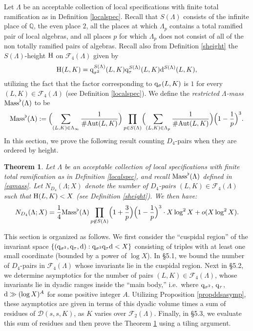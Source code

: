 \documentclass[10pt]{article}
\theoremstyle{plain}
\newtheorem{thm}{Theorem}[section]
\theoremstyle{definition}
\theoremstyle{remark}
\DeclareMathOperator{\Aut}{Aut}
\def\Aut{{\rm Aut}}
\def\Mass{{\rm Mass}}
\def\FF{{\mathcal F}}
\def\Q{{\mathbb Q}}
\def\H{{\rm H}}
\def\Q{{\mathbb Q}}
\def\cD{{\mathcal D}}
\newcommand{\D}{{\rm d}}
\newcommand{\q}{{\rm q}}
\begin{document}
Let $\Lambda$ be an acceptable collection of local
specifications with finite total ramification as in Definition \ref{localspec}. Recall that $S(\Lambda)$ consists of the infinite place of $\Q$, the even place $2$, all the places at which $\Lambda_p$ contains a  total ramified pair of local algebras, and all places $p$ for which $\Lambda_p$ does not consist of all of the non totally ramified pairs of algebras. Recall also from Definition \ref{sheight} the $S(\Lambda)$-height $\H$ on $\FF_4(\Lambda)$ given by
\begin{equation*}
\H(L,K)=\q^{S(\Lambda)}_{\sigma^2}(L,K)\q^{S(\Lambda)}_{\tau}(L,K)\D^{S(\Lambda)}(L,K),
\end{equation*}
utilizing the fact that the factor corresponding to $\q_\sigma(L,K)$ is $1$ for every $(L,K) \in \FF_4(\Lambda)$ (see Definition \ref{localspec}). We define the
{\it restricted $\Lambda$-mass} $\Mass^\flat(\Lambda)$ to be
\begin{equation}\label{eqmass}
\Mass^\flat(\Lambda):=\Bigl(\sum_{(L,K)\in\Lambda_\infty}\frac{1}{\#\Aut(L,K)}\Bigr)
\prod_{p\in S(\Lambda)} \Bigl(\sum_{(L,K)\in\Lambda_p}
\frac{1}{\#\Aut(L,K)}\Bigr)\Bigl( 1-\frac{1}{p}\Bigr)^3.
\end{equation}
In this section, we prove the following result counting $D_4$-pairs
when they are ordered by height. 
\begin{thm}\label{thD4quar}
Let $\Lambda$ be an acceptable collection of local
specifications with finite total ramification as in Definition \ref{localspec},   and recall $\Mass^\flat(\Lambda)$ defined in \eqref{eqmass}. Let $N_{D_4}(\Lambda;X)$
denote the number of $D_4$-pairs $(L,K)\in\FF_4(\Lambda)$ such that
$\H(L,K)<X$ (see Definition \ref{sheight}). We then have:
\begin{equation*}
N_{D_4}(\Lambda;X)=\frac{1}{4}\Mass^\flat(\Lambda)\prod_{p\not\in S(\Lambda)}
\Bigl(1+\frac{3}{p}\Bigr)\Bigl(1-\frac{1}{p}\Bigr)^3\cdot X\log^2 X
+o(X\log^2 X).
\end{equation*}
\end{thm}

This section is organized as follows. We first consider the ``cuspidal
region'' of the invariant space
$\{(\q_{\sigma^2},\q_{\tau},\D):\q_{\sigma^2}\q_{\tau}\D<X\}$
consisting of triples with at least one small coordinate (bounded by
a power of $\log X$). In \S5.1, we bound the number of $D_4$-pairs in
$\FF_4(\Lambda)$ whose invariants lie in the cuspidal region. Next in
\S5.2, we determine asymptotics for the number of pairs
$(L,K)\in\FF_4(\Lambda)$, whose invariants lie in dyadic ranges inside
the ``main body,'' i.e.~where $\q_{\sigma^2}$, $\q_{\tau}$, $\D \gg (\log X)^A$ for some positive integer $A$. Utilizing Proposition \ref{propddsasymp}, these asymptotics are given in terms of this dyadic
volume times a sum of residues of $\cD(s,s,K)$, as $K$ varies over
$\FF_2(\Lambda)$. Finally, in \S5.3, we evaluate this sum of residues
and then prove the Theorem \ref{thD4quar} using a tiling argument.
\end{document}
